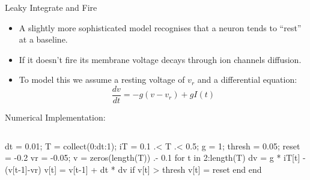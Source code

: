\documentclass[
  ignorenonframetext,
]{beamer}
\newenvironment{Shaded}{\begin{snugshade}}{\end{snugshade}}
\newcommand{\ControlFlowTok}[1]{\textcolor[rgb]{0.00,0.23,0.31}{#1}}
\newcommand{\FloatTok}[1]{\textcolor[rgb]{0.68,0.00,0.00}{#1}}
\newcommand{\FunctionTok}[1]{\textcolor[rgb]{0.28,0.35,0.67}{#1}}
\newcommand{\KeywordTok}[1]{\textcolor[rgb]{0.00,0.23,0.31}{#1}}
\newcommand{\NormalTok}[1]{\textcolor[rgb]{0.00,0.23,0.31}{#1}}
\newcommand{\OperatorTok}[1]{\textcolor[rgb]{0.37,0.37,0.37}{#1}}
\begin{document}
\begin{frame}{Leaky Integrate and Fire}
\protect\hypertarget{leaky-integrate-and-fire}{}
\begin{itemize}
\item
  A slightly more sophisticated model recognises that a neuron tends to
  ``rest'' at a baseline.
\item
  If it doesn't fire its membrane voltage decays through ion channels
  diffusion.
\item
  To model this we assume a resting voltage of \(v_r\) and a
  differential equation: \[\frac{dv}{dt} = -g(v-v_r) + gI(t)\]
\end{itemize}
\end{frame}

\begin{frame}[fragile]{Numerical Implementation:}
\protect\hypertarget{numerical-implementation-1}{}
\begin{columns}[T]
\begin{column}{0.5\textwidth}
\begin{Shaded}
\begin{Highlighting}[]
\NormalTok{dt }\OperatorTok{=} \FloatTok{0.01}\NormalTok{; T }\OperatorTok{=} \FunctionTok{collect}\NormalTok{(}\FloatTok{0}\OperatorTok{:}\NormalTok{dt}\OperatorTok{:}\FloatTok{1}\NormalTok{);}
\NormalTok{iT }\OperatorTok{=} \FloatTok{0.1} \OperatorTok{.\textless{}}\NormalTok{ T }\OperatorTok{.\textless{}} \FloatTok{0.5}\NormalTok{; }
\NormalTok{g }\OperatorTok{=} \FloatTok{1}\NormalTok{; thresh }\OperatorTok{=} \FloatTok{0.05}\NormalTok{; reset }\OperatorTok{=} \OperatorTok{{-}}\FloatTok{0.2}
\NormalTok{vr }\OperatorTok{=} \OperatorTok{{-}}\FloatTok{0.05}\NormalTok{;}
\NormalTok{v }\OperatorTok{=} \FunctionTok{zeros}\NormalTok{(}\FunctionTok{length}\NormalTok{(T)) }\OperatorTok{.{-}} \FloatTok{0.1}
\ControlFlowTok{for}\NormalTok{ t }\KeywordTok{in} \FloatTok{2}\OperatorTok{:}\FunctionTok{length}\NormalTok{(T)}
\NormalTok{    dv }\OperatorTok{=}\NormalTok{ g }\OperatorTok{*}\NormalTok{ iT[t] }\OperatorTok{{-}}\NormalTok{ (v[t}\OperatorTok{{-}}\FloatTok{1}\NormalTok{]}\OperatorTok{{-}}\NormalTok{vr)}
\NormalTok{    v[t] }\OperatorTok{=}\NormalTok{ v[t}\OperatorTok{{-}}\FloatTok{1}\NormalTok{] }\OperatorTok{+}\NormalTok{ dt }\OperatorTok{*}\NormalTok{ dv}
    \ControlFlowTok{if}\NormalTok{ v[t] }\OperatorTok{\textgreater{}}\NormalTok{ thresh}
\NormalTok{        v[t] }\OperatorTok{=}\NormalTok{ reset}
    \ControlFlowTok{end}
\ControlFlowTok{end}
\end{Highlighting}
\end{Shaded}
\end{column}


\end{columns}
\end{frame}
\end{document}
